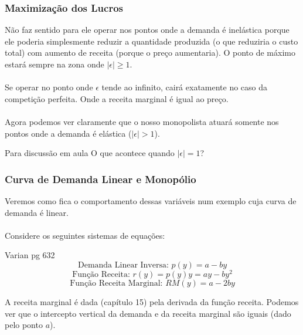 \documentclass{beamer}[10]
\begin{document}
\begin{frame}
	\frametitle{Maximização dos Lucros}

	Não faz sentido para ele operar nos pontos onde a demanda é inelástica porque ele poderia simplesmente reduzir a quantidade produzida (o que reduziria o custo total) com aumento de receita (porque o preço aumentaria). O ponto de máximo estará sempre na zona onde $|\epsilon| \geq 1$.
	\\~\\
	Se operar no ponto onde $\epsilon$ tende ao infinito, cairá exatamente no caso da competição perfeita. Onde a receita marginal é igual ao preço.
	\\~\\
	Agora podemos ver claramente que o nosso monopolista atuará somente nos pontos onde a demanda é elástica ($|\epsilon| > 1$).

	\begin{block}{Para discussão em aula}
		O que acontece quando $|\epsilon| = 1$?
	\end{block}
\end{frame}


\begin{frame}
	\frametitle{Curva de Demanda Linear e Monopólio}
	Veremos como fica o comportamento dessas variáveis num exemplo cuja curva de demanda é linear.
	\\~\\
	Considere os seguintes sistemas de equações:
	\begin{block}{Varian pg 632}
		$$ \textrm{Demanda Linear Inversa: } p(y) = a - by $$
		$$ \textrm{Função Receita: } r(y) = p(y)y = ay - by^2 $$
		$$ \textrm{Função Receita Marginal: } RM(y) = a - 2by $$
	\end{block}

	A receita marginal é dada (capítulo 15) pela derivada da função receita. Podemos ver que o intercepto vertical da demanda e da receita marginal são iguais (dado pelo ponto $a$).
\end{frame}
\end{document}
